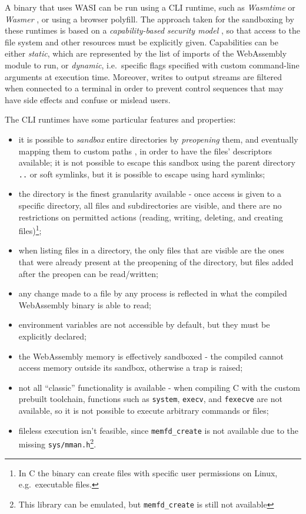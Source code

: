 A binary that uses WASI can be run using a CLI runtime, such as \textit{Wasmtime} \cite{wasmtime} or \textit{Wasmer} \cite{wasmer},
or using a browser polyfill.
The approach taken for the sandboxing by these runtimes is based on a \textit{capability-based security model} \cite{wasmtime-security-sandboxing},
so that access to the file system and other resources must be explicitly given. Capabilities can be either \textit{static}, which
are represented by the list of imports of the WebAssembly module to run, or \textit{dynamic}, i.e.\ specific flags
specified with custom command-line arguments at execution time.
Moreover, writes to output streams are filtered when connected to a terminal in order to prevent control sequences
that may have side effects and confuse or mislead users.

The CLI runtimes have some particular features and properties:
\begin{itemize}
  \item it is possible to \textit{sandbox} entire directories by \textit{preopening} them, and eventually mapping them to custom paths
        , in order to have the files' descriptors available; it is not possible to escape this sandbox using the parent directory \texttt{..}
        or soft symlinks, but it is possible to escape using hard symlinks;
  \item the directory is the finest granularity available - once access is given to a specific directory, all files and subdirectories are
        visible, and there are no restrictions on permitted actions (reading, writing, deleting, and creating files)\footnote{In C the binary can create files with specific user permissions on Linux, e.g.\ executable files.};
  \item when listing files in a directory, the only files that are visible are the ones that were already present at the preopening of the directory,
        but files added after the preopen can be read/written;
  \item any change made to a file by any process is reflected in what the compiled WebAssembly binary is able to read;
  \item environment variables are not accessible by default, but they must be explicitly declared;
  \item the WebAssembly memory is effectively sandboxed - the compiled cannot access memory outside its sandbox, otherwise a trap is raised;
  \item not all ``classic'' functionality is available - when compiling C with the custom prebuilt toolchain,
        functions such as \texttt{system}, \texttt{execv}, and \texttt{fexecve} are not available,
        so it is not possible to execute arbitrary commands or files;
  \item fileless execution isn't feasible, since \texttt{memfd\_create} is not available due to the missing
        \texttt{sys/mman.h}\footnote{This library can be emulated, but \texttt{memfd\_create} is still not available}.
\end{itemize}

